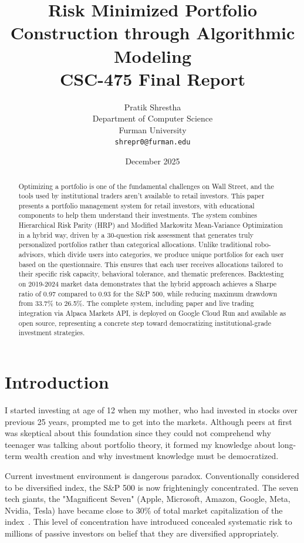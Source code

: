 \documentclass[11pt]{article}
\title{
  Risk Minimized Portfolio Construction through Algorithmic Modeling \\
  \vspace{1em}
  \small{\normalfont CSC-475 Final Report}
}
\author{Pratik Shrestha \\
Department of Computer Science \\
Furman University \\
\texttt{shrepr0@furman.edu} \\}
\date{December 2025}
\begin{document}
\maketitle


\begin{abstract}
Optimizing a portfolio is one of the fundamental challenges on Wall Street, and the tools used by institutional traders aren't available to retail investors. This paper presents a portfolio management system for retail investors, with educational components to help them understand their investments. The system combines Hierarchical Risk Parity (HRP) and Modified Markowitz Mean-Variance Optimization in a hybrid way, driven by a 30-question risk assessment that generates truly personalized portfolios rather than categorical allocations. Unlike traditional robo-advisors, which divide users into categories, we produce unique portfolios for each user based on the questionnaire. This ensures that each user receives allocations tailored to their specific risk capacity, behavioral tolerance, and thematic preferences. Backtesting on 2019-2024 market data demonstrates that the hybrid approach achieves a Sharpe ratio of 0.97 compared to 0.93 for the S\&P 500, while reducing maximum drawdown from 33.7\% to 26.5\%. The complete system, including paper and live trading integration via Alpaca Markets API, is deployed on Google Cloud Run and available as open source, representing a concrete step toward democratizing institutional-grade investment strategies.
\end{abstract}


\section{Introduction}

I started investing at age of 12 when my mother, who had invested in stocks over previous 25 years, prompted me to get into the markets. Although peers at first was skeptical about this foundation since they could not comprehend why teenager was talking about portfolio theory, it formed my knowledge about long-term wealth creation and why investment knowledge must be democratized.

Current investment environment is dangerous paradox. Conventionally considered to be diversified index, the S\&P 500 is now frighteningly concentrated. The seven tech giants, the "Magnificent Seven" (Apple, Microsoft, Amazon, Google, Meta, Nvidia, Tesla) have became close to 30\% of total market capitalization of the index~\cite{goldmansachs2024}. This level of concentration have introduced concealed systematic risk to millions of passive investors on belief that they are diversified appropriately.
\end{document}

